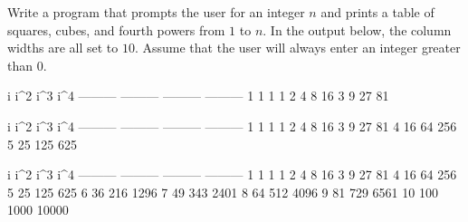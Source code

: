 Write a program that prompts the user for an integer $n$ and prints a
table of squares, cubes, and fourth powers from $1$ to $n$. In the output 
below, the column widths are all set to $10$. Assume that the user will always
enter an integer greater than $0$.

\resett
\nextt
\begin{console}[commandchars=\\\{\}]
         i       i^2       i^3       i^4
 --------- --------- --------- ---------
         1         1         1         1
         2         4         8        16
         3         9        27        81
\end{console}

\nextt
\begin{console}[commandchars=\\\{\}]
         i       i^2       i^3       i^4
 --------- --------- --------- ---------
         1         1         1         1
         2         4         8        16
         3         9        27        81
         4        16        64       256
         5        25       125       625
\end{console}

\nextt
\begin{console}[commandchars=\\\{\}]
         i       i^2       i^3       i^4
 --------- --------- --------- ---------
         1         1         1         1
         2         4         8        16
         3         9        27        81
         4        16        64       256
         5        25       125       625
         6        36       216      1296
         7        49       343      2401
         8        64       512      4096
         9        81       729      6561
        10       100      1000     10000
\end{console}
